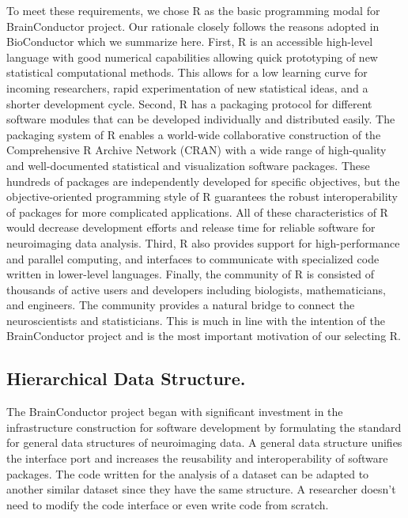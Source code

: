 \documentclass{nature}
\begin{document}
To meet these requirements, we chose R as the basic programming
modal for BrainConductor project. Our rationale closely follows
the reasons adopted in BioConductor which we summarize
here\cite{gentleman2004bioconductor}.
First, R is an accessible high-level language with
good numerical capabilities allowing quick prototyping of new statistical
computational methods. This allows for a low learning curve for
incoming researchers, rapid experimentation of
new statistical ideas, and a shorter development cycle.
Second, R has a packaging protocol for different software
modules that can be developed individually and distributed easily. The
packaging system of R enables a world-wide collaborative construction of the
Comprehensive R Archive Network (CRAN) with a wide range of
high-quality and well-documented statistical and visualization software
packages. These hundreds of packages are independently developed for specific
objectives, but the objective-oriented programming style of R guarantees the
robust interoperability of packages for more complicated applications. All of
these characteristics of R would decrease development efforts and release time
for reliable software for neuroimaging data analysis.
Third, R also provides
support for high-performance\cite{buckner2010gputools} and parallel
computing\cite{schmidberger2009state},
and interfaces to communicate with specialized code
written in lower-level languages.
Finally, the community of R is
consisted of thousands of active users and developers including biologists,
mathematicians, and engineers. The community provides a natural bridge to
connect the neuroscientists and statisticians. This is much in line with the
intention of the BrainConductor project and is the most important motivation of
our
selecting R.


\subsection{Hierarchical Data Structure.} The BrainConductor
project began with significant investment in the infrastructure construction for
software development by formulating the standard for general data structures of
neuroimaging data. A general data structure unifies the interface port and
increases the reusability and interoperability of software packages. The code
written for the analysis of a dataset can be adapted to another similar dataset
since they have the same structure. A researcher doesn't need to modify the code
interface or even write code from scratch.
\end{document}
